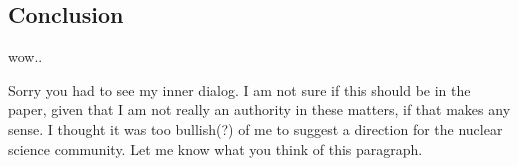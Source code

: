 \documentclass[answers,11pt]{exam}
\begin{document}
\begin{questions}
\section*{Conclusion}
        \question
         wow..

        \begin{solution}
            Sorry you had to see my inner dialog. I am not sure
            if this should be in the paper, given that I am not really
            an authority in these matters, if that makes any sense. I thought
            it was too bullish(?) of me to suggest a direction for the
            nuclear science community. Let me know what you think of this
            paragraph.
        \end{solution}

        




\end{questions}


\end{document}
